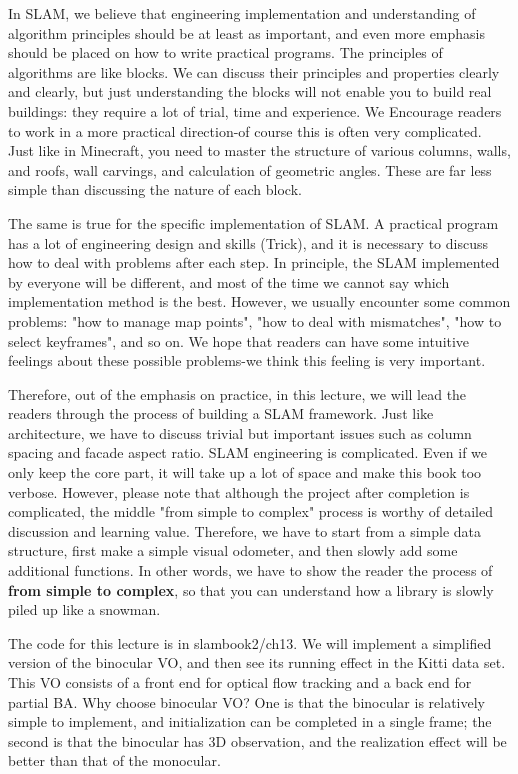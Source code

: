 In SLAM, we believe that engineering implementation and understanding of algorithm principles should be at least as important, and even more emphasis should be placed on how to write practical programs. The principles of algorithms are like blocks. We can discuss their principles and properties clearly and clearly, but just understanding the blocks will not enable you to build real buildings: they require a lot of trial, time and experience. We Encourage readers to work in a more practical direction-of course this is often very complicated. Just like in Minecraft, you need to master the structure of various columns, walls, and roofs, wall carvings, and calculation of geometric angles. These are far less simple than discussing the nature of each block.

The same is true for the specific implementation of SLAM. A practical program has a lot of engineering design and skills (Trick), and it is necessary to discuss how to deal with problems after each step. In principle, the SLAM implemented by everyone will be different, and most of the time we cannot say which implementation method is the best. However, we usually encounter some common problems: "how to manage map points", "how to deal with mismatches", "how to select keyframes", and so on. We hope that readers can have some intuitive feelings about these possible problems-we think this feeling is very important.

Therefore, out of the emphasis on practice, in this lecture, we will lead the readers through the process of building a SLAM framework. Just like architecture, we have to discuss trivial but important issues such as column spacing and facade aspect ratio. SLAM engineering is complicated. Even if we only keep the core part, it will take up a lot of space and make this book too verbose. However, please note that although the project after completion is complicated, the middle "from simple to complex" process is worthy of detailed discussion and learning value. Therefore, we have to start from a simple data structure, first make a simple visual odometer, and then slowly add some additional functions. In other words, we have to show the reader the process of \textbf{from simple to complex}, so that you can understand how a library is slowly piled up like a snowman.

The code for this lecture is in slambook2/ch13. We will implement a simplified version of the binocular VO, and then see its running effect in the Kitti data set. This VO consists of a front end for optical flow tracking and a back end for partial BA. Why choose binocular VO? One is that the binocular is relatively simple to implement, and initialization can be completed in a single frame; the second is that the binocular has 3D observation, and the realization effect will be better than that of the monocular.

